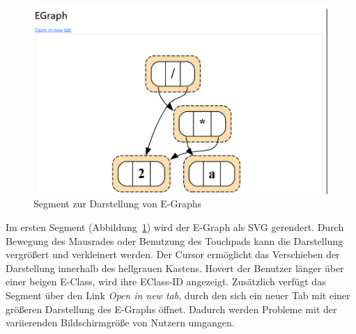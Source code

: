 \begin{figure}[H]
    \centering
    \includegraphics[scale=0.5]{../fig/egraphcontrol.png}
    \caption{Segment zur Darstellung von E-Graphs}
    \label{fig:segment1}
\end{figure}

Im ersten Segment (Abbildung~\ref{fig:segment1}) wird der E-Graph als SVG gerendert. Durch Bewegung des Mausrades oder Benutzung des Touchpads kann die Darstellung vergrößert und verkleinert werden.
Der Cursor ermöglicht das Verschieben der Darstellung innerhalb des hellgrauen Kastens. Hovert der Benutzer länger über einer beigen E-Class, wird ihre EClass-ID angezeigt.
Zusätzlich verfügt das Segment über den Link \textit{Open in new tab}, durch den
sich ein neuer Tab mit einer größeren Darstellung des E-Graphs öffnet. Dadurch werden Probleme mit der variierenden Bildschirmgröße von Nutzern umgangen.


